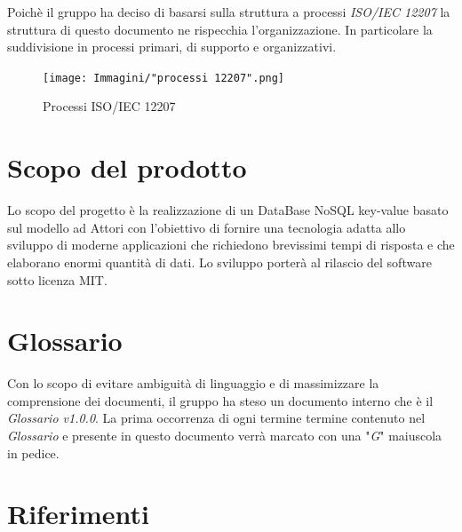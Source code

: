 \documentclass[a4paper]{report}
\begin{document}
	Poichè il gruppo ha deciso di basarsi sulla struttura a processi \emph{ISO/IEC 12207} 
	la struttura di questo documento ne rispecchia 
	l'organizzazione. In particolare la suddivisione in processi primari, di supporto e organizzativi.
	\begin{figure}[h!]
		\centering
		\texttt{[image: Immagini/"processi 12207".png]}
		\caption{Processi ISO/IEC 12207}
	\end{figure}
	\section{Scopo del prodotto}
	Lo scopo del progetto è la realizzazione di un DataBase NoSQL key-value basato sul modello ad 
	Attori con l'obiettivo di fornire una tecnologia adatta allo sviluppo di moderne 
	applicazioni che richiedono brevissimi tempi di risposta e che elaborano enormi quantità 
	di dati. Lo sviluppo porterà al rilascio del software sotto licenza MIT.
	\section{Glossario}
	Con lo scopo di evitare ambiguità di linguaggio e di massimizzare la comprensione dei documenti, il 
	gruppo ha steso un documento interno che è il \emph{Glossario v1.0.0}. La prima occorrenza
	di ogni termine termine contenuto nel \emph{Glossario} e presente in questo documento verrà 
	marcato con una "\textit{G}" maiuscola in pedice.
	\section{Riferimenti}
\end{document}
